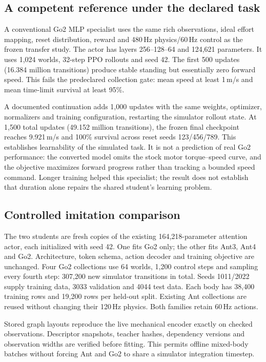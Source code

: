\documentclass[11pt,letterpaper]{article}
\begin{document}
\subsection{A competent reference under the declared task}
A conventional Go2 MLP specialist uses the same rich observations, ideal effort
mapping, reset distribution, reward and 480\,Hz physics/60\,Hz control as the
frozen transfer study. The actor has layers 256--128--64 and 124,621 parameters.
It uses 1,024 worlds, 32-step PPO rollouts and seed 42. The first 500 updates
(16.384 million transitions) produce stable standing but essentially zero
forward speed. This fails the predeclared collection gate: mean speed at least
1\,m/s and mean time-limit survival at least 95\%.

A documented continuation adds 1,000 updates with the same weights, optimizer,
normalizers and training configuration, restarting the simulator rollout state.
At 1,500 total updates (49.152 million transitions), the frozen final checkpoint
reaches 9.921\,m/s and 100\% survival across reset seeds 123/456/789.
This establishes learnability of the simulated task. It is not a prediction of
real Go2 performance: the converted model omits the stock motor torque--speed
curve, and the objective maximizes forward progress rather than tracking a
bounded speed command. Longer training helped this specialist; the result does
not establish that duration alone repairs the shared student's learning problem.

\subsection{Controlled imitation comparison}
The two students are fresh copies of the existing 164,218-parameter attention
actor, each initialized with seed 42. One fits Go2 only; the other fits Ant3,
Ant4 and Go2. Architecture, token schema, action decoder and training objective
are unchanged. Four Go2 collections use 64 worlds, 1,200 control steps and
sampling every fourth step: 307,200 new simulator transitions in total. Seeds
1011/2022 supply training data, 3033 validation and 4044 test data. Each body has
38,400 training rows and 19,200 rows per held-out split. Existing Ant collections
are reused without changing their 120\,Hz physics. Both families retain 60\,Hz
actions.

Stored graph layouts reproduce the live mechanical encoder exactly on checked
observations. Descriptor snapshots, teacher hashes, dependency versions and
observation widths are verified before fitting. This permits offline mixed-body
batches without forcing Ant and Go2 to share a simulator integration timestep.
\end{document}
